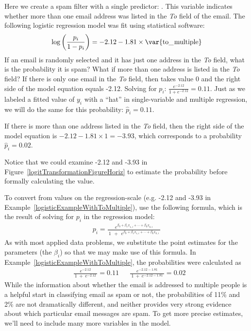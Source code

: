 \begin{example}{Here we create a spam filter with a single predictor: . This variable indicates whether more than one email address was listed in the \emph{To} field of the email. The following logistic regression model was fit using statistical software:
\begin{align*}
\log\left( \frac{p_i}{1-p_i} \right) = -2.12 - 1.81\times\text{\var{to\_\hspace{0.3mm}multiple}}
\end{align*}
If an email is randomly selected and it has just one address in the \emph{To} field, what is the probability it is spam? What if more than one address is listed in the \emph{To} field?}\label{logisticExampleWithToMultiple}
If there is only one email in the \emph{To} field, then  takes value 0 and the right side of the model equation equals -2.12. Solving for $p_i$: $\frac{e^{-2.12}}{1 + e^{-2.12}} = 0.11$. Just as we labeled a fitted value of $y_i$ with a ``hat'' in single-variable and multiple regression, we will do the same for this probability: $\hat{p}_i = 0.11$.

If there is more than one address listed in the \emph{To} field, then the right side of the model equation is $-2.12 - 1.81\times1 = -3.93$, which corresponds to a probability $\hat{p}_i = 0.02$.

Notice that we could examine -2.12 and -3.93 in Figure~\ref{logitTransformationFigureHoriz} to estimate the probability before formally calculating the value.
\end{example}

To convert from values on the regression-scale (e.g. -2.12 and -3.93 in Example~\ref{logisticExampleWithToMultiple}), use the following formula, which is the result of solving for $p_i$ in the regression model:
\begin{align*}
p_i
	= \frac{e^{\beta_0 + \beta_1 x_{1,i}+\cdots+\beta_k x_{k,i}}}
		{\ 1\ \ +\ \ e^{\beta_0 + \beta_1 x_{1,i}+\cdots+\beta_k x_{k,i}}\ }
\end{align*}
As with most applied data problems, we substitute the point estimates for the parameters (the $\beta_i$) so that we may make use of this formula. In Example~\ref{logisticExampleWithToMultiple}, the probabilities were calculated as
\begin{align*}
&\frac{\ e^{-2.12}\ }{\ 1\ +\ e^{-2.12}\ } = 0.11 && \frac{\ e^{-2.12 - 1.81}\ }{\ 1\ +\ e^{-2.12 - 1.81}\ } = 0.02
\end{align*}
While the information about whether the email is addressed to multiple people is a helpful start in classifying email as spam or not, the probabilities of 11\% and 2\% are not dramatically different, and neither provides very strong evidence about which particular email messages are spam. To get more precise estimates, we'll need to include many more variables in the model.

